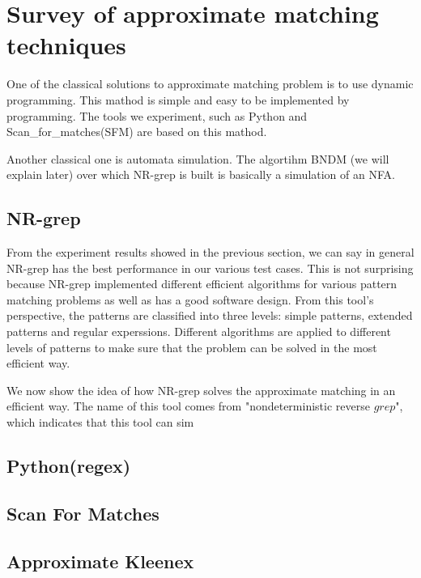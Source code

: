 \section{Survey of approximate matching techniques}
One of the classical solutions to approximate matching problem is to use dynamic programming. This mathod is simple and easy to be implemented by programming. The tools we experiment, such as Python and Scan\_for\_matches(SFM) are based on this mathod.

Another classical one is automata simulation. The algortihm BNDM  (we will explain later) over which NR-grep is built is basically a simulation of an NFA. 

\subsection{NR-grep}
From the experiment results showed in the previous section, we can say in general NR-grep has the best performance in our various test cases. This is not surprising because NR-grep implemented different efficient algorithms for various pattern matching problems as well as has a good software design. From this tool's perspective, the patterns are classified into three levels: simple patterns, extended patterns and regular experssions. Different algorithms are applied to different levels of patterns to make sure that the problem can be solved in the most efficient way. 

We now show the idea of how NR-grep solves the approximate matching in an efficient way. The name of this tool comes from "nondeterministic reverse $grep$", which indicates that this tool can sim


\subsection{Python(regex)}

\subsection{Scan For Matches}


\subsection{Approximate Kleenex}